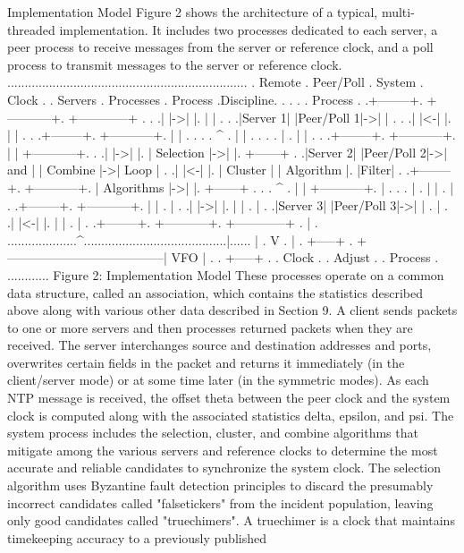  Implementation Model
 Figure 2 shows the architecture of a typical, multi-threaded
 implementation. It includes two processes dedicated to each server,
 a peer process to receive messages from the server or reference
 clock, and a poll process to transmit messages to the server or
 reference clock.
 .....................................................................
 . Remote . Peer/Poll . System . Clock .
 . Servers . Processes . Process .Discipline.
 . . . . Process .
 .+--------+. +-----------+. +------------+ . .
 .| |->| |. | | . .
 .|Server 1| |Peer/Poll 1|->| | . .
 .| |<-| |. | | . .
 .+--------+. +-----------+. | | . .
 . . ^ . | | . .
 . . | . | | . .
 .+--------+. +-----------+. | | +-----------+. .
 .| |->| |. | Selection |->| |. +------+ .
 .|Server 2| |Peer/Poll 2|->| and | | Combine |->| Loop | .
 .| |<-| |. | Cluster | | Algorithm |. |Filter| .
 .+--------+. +-----------+. | Algorithms |->| |. +------+ .
 . . ^ . | | +-----------+. | .
 . . | . | | . | .
 .+--------+. +-----------+. | | . | .
 .| |->| |. | | . | .
 .|Server 3| |Peer/Poll 3|->| | . | .
 .| |<-| |. | | . | .
 .+--------+. +-----------+. +------------+ . | .
 ....................^.........................................|......
 | . V .
 | . +-----+ .
 +--------------------------------------| VFO | .
 . +-----+ .
 . Clock .
 . Adjust .
 . Process .
 ............
 Figure 2: Implementation Model
These processes operate on a common data structure, called an
 association, which contains the statistics described above along with
 various other data described in Section 9. A client sends packets to
 one or more servers and then processes returned packets when they are
 received. The server interchanges source and destination addresses
 and ports, overwrites certain fields in the packet and returns it
 immediately (in the client/server mode) or at some time later (in the
 symmetric modes). As each NTP message is received, the offset theta
 between the peer clock and the system clock is computed along with
 the associated statistics delta, epsilon, and psi.
 The system process includes the selection, cluster, and combine
 algorithms that mitigate among the various servers and reference
 clocks to determine the most accurate and reliable candidates to
 synchronize the system clock. The selection algorithm uses Byzantine
 fault detection principles to discard the presumably incorrect
 candidates called "falsetickers" from the incident population,
 leaving only good candidates called "truechimers". A truechimer is a
 clock that maintains timekeeping accuracy to a previously published
